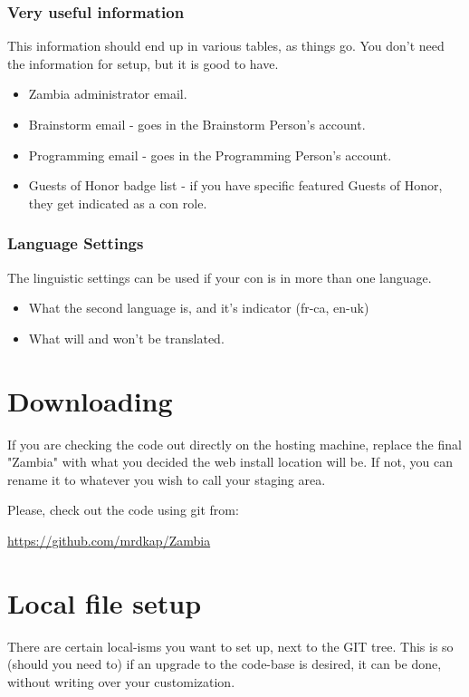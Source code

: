 \documentclass[captions=tablesignature]{scrartcl}
\begin{document}
\subsubsection{Very useful information}
\label{sec-1-2-6}

This information should end up in various tables, as things go.
You don't need the information for setup, but it is good to have.
\begin{itemize}
\item Zambia administrator email.
\item Brainstorm email - goes in the Brainstorm Person's account.
\item Programming email - goes in the Programming Person's account.
\item Guests of Honor badge list - if you have specific featured Guests
of Honor, they get indicated as a con role.
\end{itemize}

\subsubsection{Language Settings}
\label{sec-1-2-7}

The linguistic settings can be used if your con is in more than
one language.
\begin{itemize}
\item What the second language is, and it's indicator (fr-ca, en-uk)
\item What will and won't be translated.
\end{itemize}

\section{Downloading}
\label{sec-2}

If you are checking the code out directly on the hosting machine,
replace the final "Zambia" with what you decided the web install
location will be.  If not, you can rename it to whatever you wish to
call your staging area.

Please, check out the code using git from:

\url{https://github.com/mrdkap/Zambia}

\section{Local file setup}
\label{sec-3}

There are certain local-isms you want to set up, next to the GIT 
tree. This is so (should you need to) if an upgrade to the code-base
is desired, it can be done, without writing over your
customization.
\end{document}
